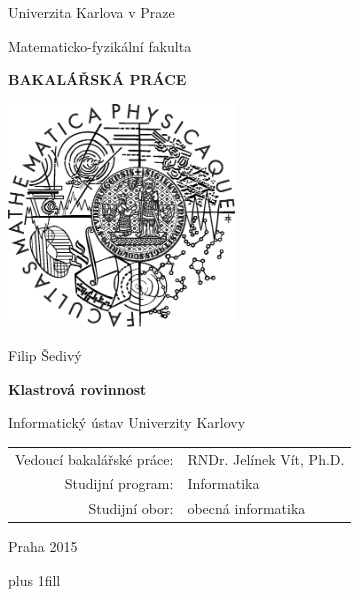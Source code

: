 \documentclass[12pt,a4report]{report}
\theoremstyle{definition}
\begin{document}
\author{Filip Šedivý}
\begin{center}

\large

Univerzita Karlova v Praze

\medskip

Matematicko-fyzikální fakulta

\vfill

{\bf\Large BAKALÁŘSKÁ PRÁCE}

\vfill

\centerline{\mbox{\includegraphics[width=60mm]{logo.eps}}}

\vfill
\vspace{5mm}

{\LARGE Filip Šedivý}

\vspace{15mm}

{\LARGE\bfseries Klastrová rovinnost}

\vfill

Informatický ústav Univerzity Karlovy

\vfill

\begin{tabular}{rl}

Vedoucí bakalářské práce: & RNDr. Jelínek Vít, Ph.D.\\
\noalign{\vspace{2mm}}
Studijní program: & Informatika \\
\noalign{\vspace{2mm}}
Studijní obor: & obecná informatika \\
\end{tabular}

\vfill

Praha 2015 

\end{center}

\newpage

\vglue 0pt plus 1fill
\end{document}
